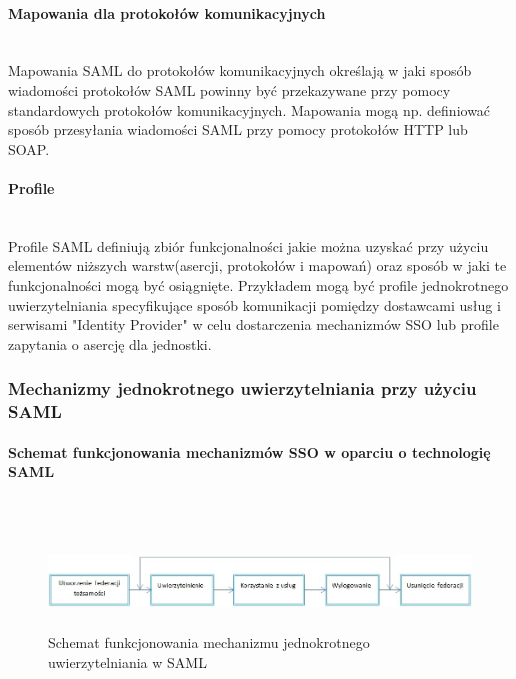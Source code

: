 		\paragraph{Mapowania dla protokołów komunikacyjnych}\mbox{}\\

			Mapowania SAML do protokołów komunikacyjnych określają w jaki sposób wiadomości protokołów SAML powinny być przekazywane przy pomocy standardowych protokołów komunikacyjnych.  Mapowania mogą np. definiować sposób przesyłania wiadomości SAML przy pomocy protokołów HTTP lub SOAP.

		\paragraph{Profile}\mbox{}\\

			Profile SAML definiują zbiór funkcjonalności jakie można uzyskać przy użyciu elementów niższych warstw(asercji, protokołów i mapowań) oraz sposób w jaki te funkcjonalności mogą być osiągnięte. Przykładem mogą być profile jednokrotnego uwierzytelniania specyfikujące sposób komunikacji pomiędzy dostawcami usług i serwisami "Identity Provider" w celu dostarczenia mechanizmów SSO lub profile zapytania o asercję dla jednostki.

	\subsubsection{Mechanizmy jednokrotnego uwierzytelniania przy użyciu SAML}

		\paragraph{Schemat funkcjonowania mechanizmów SSO w oparciu o technologię SAML}\mbox{}\\

			\begin{figure}[h]
				\centering
					\includegraphics[width=15cm,height=2.5cm]{img/samlSSO.jpg}
				\caption{Schemat funkcjonowania mechanizmu jednokrotnego uwierzytelniania w SAML}
				\label{Schemat funkcjonowania mechanizmu jednokrotnego uwierzytelniania w SAML}
			\end{figure}

